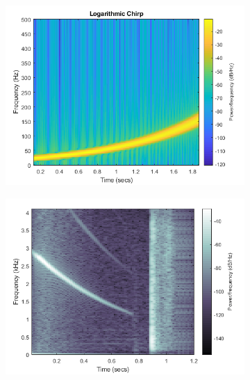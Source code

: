 \begin{figure}[h]
	\begin{subfigure}{0.5\textwidth}
		\includegraphics[scale=0.35]{pasta1_figuras/spectrogram1.png}
		\caption{}
	\end{subfigure}
	\hspace*{\fill} %
	\begin{subfigure}{0.5\textwidth}
		\includegraphics[scale=0.462]{pasta1_figuras/spectrogram4.png}
		\caption{}
	\end{subfigure}


\end{figure}
